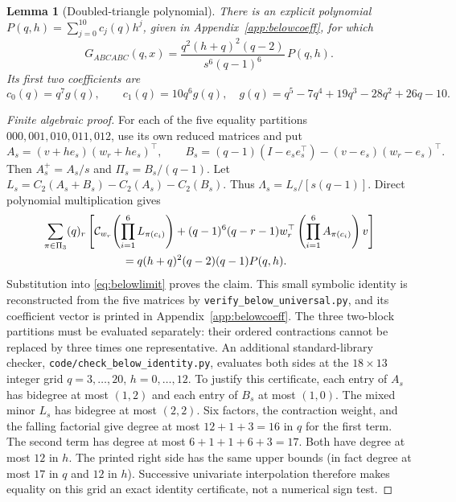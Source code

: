 \documentclass[11pt,a4paper]{article}
\newtheorem{lemma}[theorem]{Lemma}
\theoremstyle{remark}\newtheorem{remark}[theorem]{Remark}
\begin{document}
\begin{lemma}[Doubled-triangle polynomial]\label{lem:belowpoly}
There is an explicit polynomial $P(q,h)=\sum_{j=0}^{10}c_j(q)h^j$, given in Appendix~\ref{app:belowcoeff}, for which
\begin{equation}\label{eq:belowpoly}
\boxed{\quad
G_{ABCABC}(q,x)=
\frac{q^2(h+q)^2(q-2)}{s^6(q-1)^6}\,P(q,h).
\quad}
\end{equation}
Its first two coefficients are
\[
c_0(q)=q^7g(q),\qquad c_1(q)=10q^6g(q),
\quad g(q)=q^5-7q^4+19q^3-28q^2+26q-10.
\]
\end{lemma}
\begin{proof}[Finite algebraic proof]
For each of the five equality partitions $000,001,010,011,012$, use its own reduced matrices and put
\[
A_s=(v+he_s)(w_r+he_s)^\top,\qquad
B_s=(q-1)(I-e_se_s^\top)-(v-e_s)(w_r-e_s)^\top.
\]
Then $A_s^{+}=A_s/s$ and $\Pi_s=B_s/(q-1)$. Let
$L_s=C_2(A_s+B_s)-C_2(A_s)-C_2(B_s)$.
Thus $\Lambda_s=L_s/[s(q-1)]$. Direct polynomial multiplication gives
\begin{equation}\label{eq:belowidentity}
\begin{split}
&\sum_{\pi\in\Pi_3}(q)_r\left[
\CC_{w_r}\!\left(\prod_{i=1}^{6}L_{\pi(c_i)}\right)
+(q-1)^6(q-r-1)w_r^\top\left(\prod_{i=1}^{6}A_{\pi(c_i)}\right)v\right]\\
&\hspace{25mm}=q(h+q)^2(q-2)(q-1)P(q,h).
\end{split}
\end{equation}
Substitution into \eqref{eq:belowlimit} proves the claim. This small symbolic identity is reconstructed from the five matrices by \texttt{verify\_below\_universal.py}, and its coefficient vector is printed in Appendix~\ref{app:belowcoeff}. The three two-block partitions must be evaluated separately: their ordered contractions cannot be replaced by three times one representative.
An additional standard-library checker, \texttt{code/check\_below\_identity.py}, evaluates both sides at the $18\times13$ integer grid $q=3,\ldots,20$, $h=0,\ldots,12$. To justify this certificate, each entry of $A_s$ has bidegree at most $(1,2)$ and each entry of $B_s$ at most $(1,0)$. The mixed minor $L_s$ has bidegree at most $(2,2)$. Six factors, the contraction weight, and the falling factorial give degree at most $12+1+3=16$ in $q$ for the first term. The second term has degree at most $6+1+1+6+3=17$. Both have degree at most $12$ in $h$. The printed right side has the same upper bounds (in fact degree at most $17$ in $q$ and $12$ in $h$). Successive univariate interpolation therefore makes equality on this grid an exact identity certificate, not a numerical sign test.
\end{proof}
\end{document}
